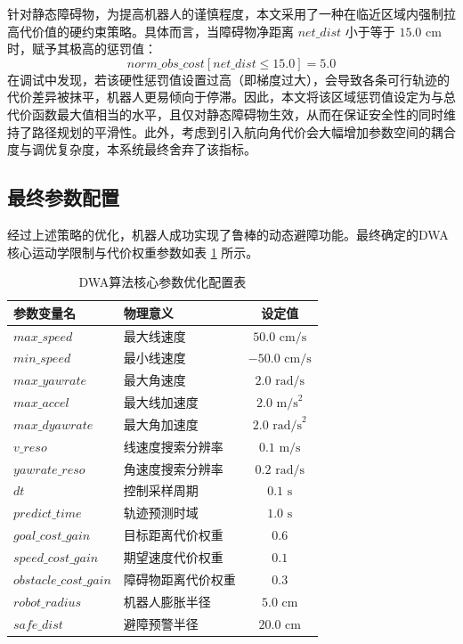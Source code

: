 针对静态障碍物，为提高机器人的谨慎程度，本文采用了一种在临近区域内强制拉高代价值的硬约束策略。具体而言，当障碍物净距离 $net\_dist$ 小于等于 $15.0\text{ cm}$ 时，赋予其极高的惩罚值：
\begin{equation}
norm\_obs\_cost[net\_dist \le 15.0] = 5.0
\end{equation}
在调试中发现，若该硬性惩罚值设置过高（即梯度过大），会导致各条可行轨迹的代价差异被抹平，机器人更易倾向于停滞。因此，本文将该区域惩罚值设定为与总代价函数最大值相当的水平，且仅对静态障碍物生效，从而在保证安全性的同时维持了路径规划的平滑性。此外，考虑到引入航向角代价会大幅增加参数空间的耦合度与调优复杂度，本系统最终舍弃了该指标。

\subsection{最终参数配置}

经过上述策略的优化，机器人成功实现了鲁棒的动态避障功能。最终确定的DWA核心运动学限制与代价权重参数如表 \ref{tab:dwa_params} 所示。

\begin{table}[htbp]
    \centering
    \caption{DWA算法核心参数优化配置表}
    \label{tab:dwa_params}
    \begin{tabular}{llc}
        \toprule
        \textbf{参数变量名} & \textbf{物理意义} & \textbf{设定值} \\
        \midrule
        $max\_speed$ & 最大线速度 & $50.0 \text{ cm/s}$ \\
        $min\_speed$ & 最小线速度 & $-50.0 \text{ cm/s}$ \\
        $max\_yawrate$ & 最大角速度 & $2.0 \text{ rad/s}$ \\
        $max\_accel$ & 最大线加速度 & $2.0 \text{ m/s}^2$ \\
        $max\_dyawrate$ & 最大角加速度 & $2.0 \text{ rad/s}^2$ \\
        $v\_reso$ & 线速度搜索分辨率 & $0.1 \text{ m/s}$ \\
        $yawrate\_reso$ & 角速度搜索分辨率 & $0.2 \text{ rad/s}$ \\
        $dt$ & 控制采样周期 & $0.1 \text{ s}$ \\
        $predict\_time$ & 轨迹预测时域 & $1.0 \text{ s}$ \\
        $goal\_cost\_gain$ & 目标距离代价权重 & $0.6$ \\
        $speed\_cost\_gain$ & 期望速度代价权重 & $0.1$ \\
        $obstacle\_cost\_gain$ & 障碍物距离代价权重 & $0.3$ \\
        $robot\_radius$ & 机器人膨胀半径 & $5.0 \text{ cm}$ \\
        $safe\_dist$ & 避障预警半径 & $20.0 \text{ cm}$ \\
        \bottomrule
    \end{tabular}
\end{table}

